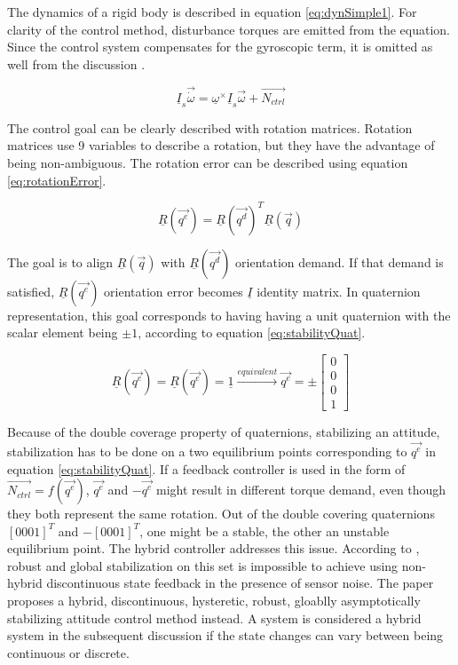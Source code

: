 The dynamics of a rigid body is described in equation \ref{eq:dynSimple1}. For clarity of the control method, disturbance torques are emitted from the equation. Since the control system compensates for the gyroscopic term, it is omitted as well from the discussion .

\begin{equation}
\label{eq:dynSimple1}
\underline{I}_s \vec{\dot{\omega}} = \underline{\omega}^\times \underline{I}_s \vec{\omega} + \vec{N_{ctrl}}
\end{equation}

The control goal can be clearly described with rotation matrices. Rotation matrices use 9 variables to describe a rotation, but they have the advantage of being non-ambiguous. The rotation error can be described using equation \ref{eq:rotationError}. 

\begin{equation}
\label{eq:rotationError}
\underline{R}(\vec{q^e}) = \underline{R}(\vec{q^d})^T \underline{R}(\vec{q})
\end{equation}

The goal is to align $\underline{R}(\vec{q})$ with $\underline{R}(\vec{q^d})$ orientation demand. If that demand is satisfied, $\underline{{R}}(\vec{q^e})$ orientation error becomes $\underline{I}$ identity matrix. In quaternion representation, this goal corresponds to having having a unit quaternion with the scalar element being $\pm 1$, according to equation \ref{eq:stabilityQuat}. 

\begin{equation}
\label{eq:stabilityQuat}
\underline{R}(\vec{q^e}) = \underline{R}(\vec{q^e}) = \underline{1} \xrightarrow{equivalent} \vec{q^e}  = \pm	\begin{bmatrix}
0 \\
0 \\
0 \\
1
\end{bmatrix} 	
\end{equation}

Because of the double coverage property of quaternions, stabilizing an attitude, stabilization has to be done on a two equilibrium points corresponding to $\vec{q^e}$ in equation \ref{eq:stabilityQuat}. If a feedback controller is used in the form of $\vec{N_{ctrl}} = f(\vec{q^e})$, $\vec{q^e}$ and $-\vec{q^e}$ might result in different torque demand, even though they both represent the same rotation. Out of the double covering quaternions $[0 0 0 1]^T$ and $-[0 0 0 1]^T$, one might be a stable, the other an unstable equilibrium point. The hybrid controller addresses this issue. According to \cite{globalAttController}, robust and global stabilization on this set is impossible to achieve using non-hybrid discontinuous state feedback in the presence of sensor noise. The paper proposes a hybrid, discontinuous, hysteretic, robust, gloablly asymptotically stabilizing attitude control method instead. A system is considered a hybrid system in the subsequent discussion if the state changes can vary between being continuous or discrete.

